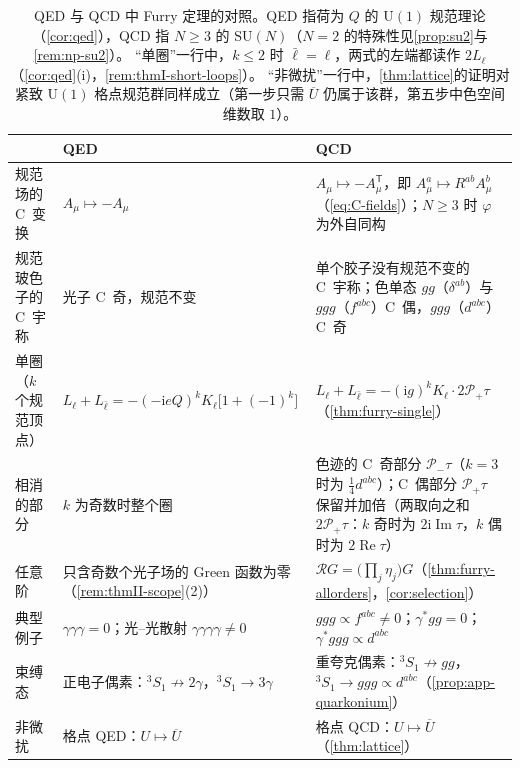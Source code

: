 \documentclass[UTF8,a4paper,11pt,fontset=fandol]{ctexart}
\theoremstyle{cplain}
\theoremstyle{cdefinition}
\theoremstyle{cremark}
\numberwithin{equation}{section}
\DeclareMathOperator{\Real}{Re}
\DeclareMathOperator{\Imag}{Im}
\newcommand{\tp}{\mathsf{T}}                         %
\newcommand{\Rop}{\mathcal{R}}                       %
\newcommand{\Pp}{\mathcal{P}_{+}}                    %
\newcommand{\Pm}{\mathcal{P}_{-}}                    %
\newcommand{\ii}{\mathrm{i}}                        %
\begin{document}
\begin{table}[htb]
\centering
\caption{QED 与 QCD 中 Furry 定理的对照。QED 指荷为 $Q$ 的 $\mathrm U(1)$ 规范理论（\cref{cor:qed}），QCD 指 $N\ge3$ 的 $\mathrm{SU}(N)$（$N=2$ 的特殊性见\cref{prop:su2}与\cref{rem:np-su2}）。
“单圈”一行中，$k\le2$ 时 $\bar\ell=\ell$，两式的左端都读作 $2L_\ell$（\cref{cor:qed}(i)，\cref{rem:thmI-short-loops}）。
“非微扰”一行中，\cref{thm:lattice}的证明对紧致 $\mathrm U(1)$ 格点规范群同样成立（第一步只需 $\overline U$ 仍属于该群，第五步中色空间维数取 $1$）。}
\label{tab:app-qed-vs-qcd}
\small
\renewcommand{\arraystretch}{1.2}
\begin{tabularx}{\textwidth}{@{}>{\raggedright\arraybackslash}p{3.45cm} >{\raggedright\arraybackslash\hsize=0.8\hsize}X >{\raggedright\arraybackslash\hsize=1.2\hsize}X@{}}
\toprule
 & QED & QCD \\
\midrule
规范场的 C~变换 & $A_\mu\mapsto-A_\mu$ & $A_\mu\mapsto-A_\mu^{\tp}$，即 $A^a_\mu\mapsto R^{ab}A^b_\mu$（\cref{eq:C-fields}）；$N\ge3$ 时 $\varphi$ 为外自同构 \\
规范玻色子的 C~宇称 & 光子 C~奇，规范不变 & 单个胶子没有规范不变的 C~宇称；色单态 $gg$（$\delta^{ab}$）与 $ggg$（$f^{abc}$）C~偶，$ggg$（$d^{abc}$）C~奇 \\
单圈（$k$ 个规范顶点） & $L_\ell+L_{\bar\ell}=-(-\ii eQ)^kK_\ell\bigl[1+(-1)^k\bigr]$ & $L_\ell+L_{\bar\ell}=-(\ii g)^kK_\ell\cdot2\Pp\tau$（\cref{thm:furry-single}） \\
相消的部分 & $k$ 为奇数时整个圈 & 色迹的 C~奇部分 $\Pm\tau$（$k=3$ 时为 $\frac14d^{abc}$）；C~偶部分 $\Pp\tau$ 保留并加倍（两取向之和 $2\Pp\tau$：$k$ 奇时为 $2\ii\Imag\tau$，$k$ 偶时为 $2\Real\tau$） \\
任意阶 & 只含奇数个光子场的 Green 函数为零（\cref{rem:thmII-scope}(2)） & $\Rop G=\bigl(\prod_j\eta_j\bigr)G$（\cref{thm:furry-allorders}，\cref{cor:selection}） \\
典型例子 & $\gamma\gamma\gamma=0$；光--光散射 $\gamma\gamma\gamma\gamma\neq0$ & $ggg\propto f^{abc}\neq0$；$\gamma^*gg=0$；$\gamma^*ggg\propto d^{abc}$ \\
束缚态 & 正电子偶素：${}^3S_1\not\to2\gamma$，${}^3S_1\to3\gamma$ & 重夸克偶素：${}^3S_1\not\to gg$，${}^3S_1\to ggg\propto d^{abc}$（\cref{prop:app-quarkonium}） \\
非微扰 & 格点 QED：$U\mapsto\overline U$ & 格点 QCD：$U\mapsto\overline U$（\cref{thm:lattice}） \\
\bottomrule
\end{tabularx}
\end{table}
\end{document}
